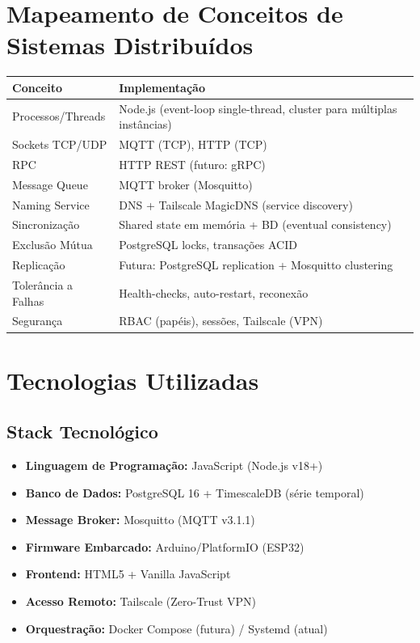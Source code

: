 \documentclass[12pt,a4paper,oneside]{report}
\begin{document}
\chapter{Mapeamento de Conceitos de Sistemas Distribuídos}

\begin{center}
\begin{tabular}{|m{3.5cm}|m{9.5cm}|}
    \hline
    \rowcolor{lightblue}
    \textbf{Conceito} & \textbf{Implementação} \\
    \hline
    Processos/Threads & Node.js (event-loop single-thread, cluster para múltiplas instâncias) \\
    \hline
    Sockets TCP/UDP & MQTT (TCP), HTTP (TCP) \\
    \hline
    RPC & HTTP REST (futuro: gRPC) \\
    \hline
    Message Queue & MQTT broker (Mosquitto) \\
    \hline
    Naming Service & DNS + Tailscale MagicDNS (service discovery) \\
    \hline
    Sincronização & Shared state em memória + BD (eventual consistency) \\
    \hline
    Exclusão Mútua & PostgreSQL locks, transações ACID \\
    \hline
    Replicação & Futura: PostgreSQL replication + Mosquitto clustering \\
    \hline
    Tolerância a Falhas & Health-checks, auto-restart, reconexão \\
    \hline
    Segurança & RBAC (papéis), sessões, Tailscale (VPN) \\
    \hline
\end{tabular}
\end{center}

\chapter{Tecnologias Utilizadas}

\section{Stack Tecnológico}

\begin{itemize}
    \item \textbf{Linguagem de Programação:} JavaScript (Node.js v18+)
    \item \textbf{Banco de Dados:} PostgreSQL 16 + TimescaleDB (série temporal)
    \item \textbf{Message Broker:} Mosquitto (MQTT v3.1.1)
    \item \textbf{Firmware Embarcado:} Arduino/PlatformIO (ESP32)
    \item \textbf{Frontend:} HTML5 + Vanilla JavaScript
    \item \textbf{Acesso Remoto:} Tailscale (Zero-Trust VPN)
    \item \textbf{Orquestração:} Docker Compose (futura) / Systemd (atual)
\end{itemize}
\end{document}
